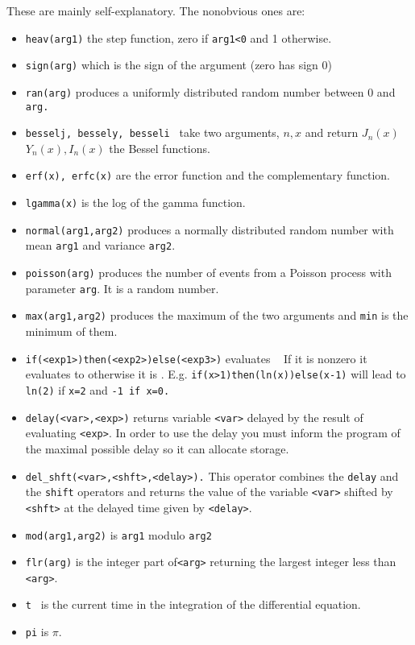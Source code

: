 These are mainly self-explanatory. The nonobvious ones are:
\begin{itemize}\itemsep -.05in
\item {\tt heav(arg1)} the step function, zero if {\tt arg1<0} and 1 otherwise.
\item {\tt sign(arg)} which is the sign of the argument (zero has sign 0)
\item {\tt ran(arg)} produces a uniformly distributed random number
between 0 and {\tt arg.}
\item {\tt besselj, bessely, besseli  } take two arguments, $n,x$ and return
$J_n(x)$ $Y_n(x),I_n(x)$ the Bessel functions.
\item { \tt erf(x), erfc(x)} are the error function and the
complementary function. 
\item {\tt lgamma(x)} is the log of the gamma function. 
\item {\tt normal(arg1,arg2)} produces a normally distributed random number
with mean {\tt arg1}  and variance {\tt arg2}.
\item {\tt poisson(arg)} produces the number of events from a Poisson process with parameter {\tt arg}.  It is a random number.  
\item {\tt max(arg1,arg2)} produces the maximum of the two arguments
and {\tt min}  is 
the minimum of them.
\item {\tt if(<exp1>)then(<exp2>)else(<exp3>)} evaluates {\tt <exp1> }
If it is nonzero 
it evaluates to {\tt <exp2>} otherwise it is { \tt <exp3>}.  E.g. {\tt if(x>1)then(ln(x))else(x-1)}
will lead to {\tt ln(2)}  if {\tt x=2}  and { \tt -1 if x=0.}
\item {\tt delay(<var>,<exp>)} returns variable {\tt <var>} delayed by the result of
 evaluating {\tt <exp>}.  In order to use the delay you must inform
the program of the maximal possible delay so it can allocate storage.
\item {\tt del\_shft(<var>,<shft>,<delay>).} This operator combines the
{\tt delay} and the {\tt shift} operators and returns the value of the
variable {\tt <var>} shifted by {\tt <shft>} at the delayed time given
by {\tt <delay>}.
\item {\tt mod(arg1,arg2)} is {\tt arg1} modulo {\tt arg2}
\item {\tt  flr(arg)}  is the integer part of{\tt  <arg>} returning the largest integer less than {\tt <arg>}.  
\item  {\tt t } is the current time in the integration of the differential equation.
\item {\tt  pi}  is $\pi.$ 

\end{itemize}
